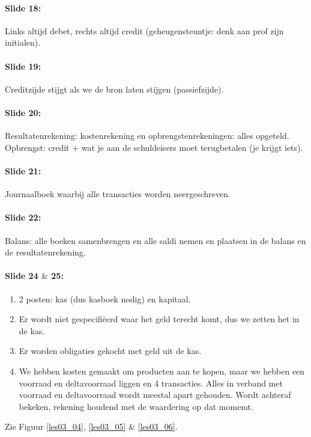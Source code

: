 \documentclass[10pt,a4paper]{report}
\begin{document}
\paragraph{Slide 18:} Links altijd debet, rechts altijd credit (geheugensteuntje: denk aan prof zijn initialen).

\paragraph{Slide 19:} Creditzijde stijgt als we de bron laten stijgen (passiefzijde).

\paragraph{Slide 20:} Resultatenrekening: kostenrekening en opbrengstenrekeningen: alles opgeteld. Opbrengst: credit + wat je aan de schuldeisers moet terugbetalen (je krijgt iets).

\paragraph{Slide 21:} Journaalboek waarbij alle transacties worden neergeschreven.

\paragraph{Slide 22:} Balans: alle boeken samenbrengen en alle saldi nemen en plaatsen in de balans en de resultatenrekening.

\paragraph{Slide 24 $\&$ 25:}
\begin{enumerate}
\item 2 posten: kas (dus kasboek nodig) en kapitaal.
\item Er wordt niet gespecifi\"eerd waar het geld terecht komt, dus we zetten het in de kas.
\item Er worden obligaties gekocht met geld uit de kas.
\item We hebben kosten gemaakt om producten aan te kopen, maar we hebben een voorraad en deltavoorraad liggen en 4 transacties. Alles in verband met voorraad en deltavoorraad wordt meestal apart gehouden. Wordt achteraf bekeken, rekening houdend met de waardering op dat momemt.
\end{enumerate}

Zie Figuur \ref{les03_04}, \ref{les03_05} $\&$ \ref{les03_06}.
\end{document}

